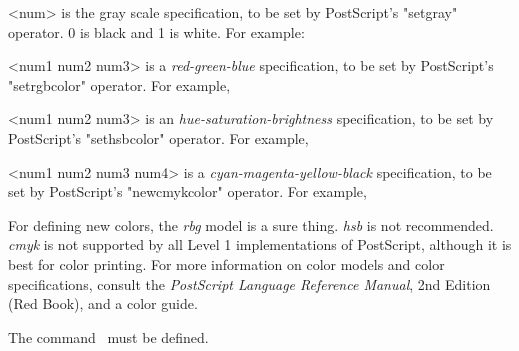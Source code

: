 \begin{description}

\mitem {}

  <num> is the gray scale specification, to be set by PostScript's "setgray"
operator. 0 is black and 1 is white. For example:
\begin{LVerb}
\end{LVerb}

\mitem {}

  <num1 num2 num3> is a {\em red-green-blue} specification, to be set by
PostScript's "setrgbcolor" operator. For example,
\begin{LVerb}
\end{LVerb}

\mitem {}

  <num1 num2 num3> is an {\em hue-saturation-brightness} specification, to be
set by PostScript's "sethsbcolor" operator. For example,
\begin{LVerb}
\end{LVerb}

\mitem {}

  <num1 num2 num3 num4> is a {\em cyan-magenta-yellow-black} specification, to
be set by PostScript's "newcmykcolor" operator. For example,
\begin{LVerb}
\end{LVerb}

\end{description}

For defining new colors, the {\em rbg} model is a sure thing. {\em hsb} is not
recommended. {\em cmyk} is not supported by all Level 1 implementations of
PostScript, although it is best for color printing. For more information on
color models and color specifications, consult the {\em PostScript Language
Reference Manual}, 2nd Edition (Red Book), and a color guide.

\begin{drivers} The command \n\pstVerb\ must be defined.\end{drivers}



